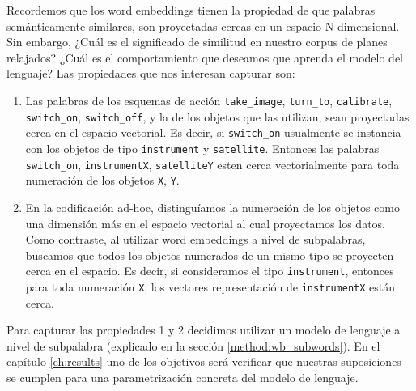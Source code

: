Recordemos que los word embeddings tienen la propiedad de que palabras
semánticamente similares, son proyectadas cercas en un espacio N-dimensional.
Sin embargo, ¿Cuál es el significado de similitud en nuestro corpus de planes
relajados? ¿Cuál es el comportamiento que deseamos que aprenda el modelo del
lenguaje? Las propiedades que nos interesan capturar son:

\begin{enumerate}
    \item Las palabras de los esquemas de acción \verb|take_image|,
    \verb|turn_to|, \verb|calibrate|, \verb|switch_on|, \verb|switch_off|, y la
    de los objetos que las utilizan, sean proyectadas cerca en el espacio
    vectorial. Es decir, si \verb|switch_on| usualmente se instancia con los
    objetos de tipo \verb|instrument| y \verb|satellite|. Entonces las palabras
    \verb|switch_on|, \verb|instrumentX|, \verb|satelliteY| esten cerca
    vectorialmente para toda numeración de los objetos \verb|X|, \verb|Y|.
    \item En la codificación ad-hoc, distinguíamos la numeración de los objetos
    como una dimensión más en el espacio vectorial al cual proyectamos los
    datos. Como contraste, al utilizar word embeddings a nivel de
    subpalabras, buscamos que todos los objetos numerados de un mismo tipo se
    proyecten cerca en el espacio. Es decir, si consideramos el tipo
    \verb|instrument|, entonces para toda numeración \verb|X|, los vectores
    representación de \verb|instrumentX| están cerca.
\end{enumerate}

Para capturar las propiedades 1 y 2 decidimos utilizar un modelo de lenguaje a
nivel de subpalabra (explicado en la sección \ref{method:wb_subwords}). En el
capítulo \ref{ch:results} uno de los objetivos será verificar que nuestras
suposiciones se cumplen para una parametrización concreta del modelo de
lenguaje.

